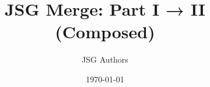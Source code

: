 \documentclass[11pt]{article}
\title{JSG Merge: Part I → II (Composed)}
\author{JSG Authors}
\date{\today}
\begin{document}
\maketitle

\newcommand{\JSGWrap}{C}



























\nocite{*}
\printbibliography
\end{document}
